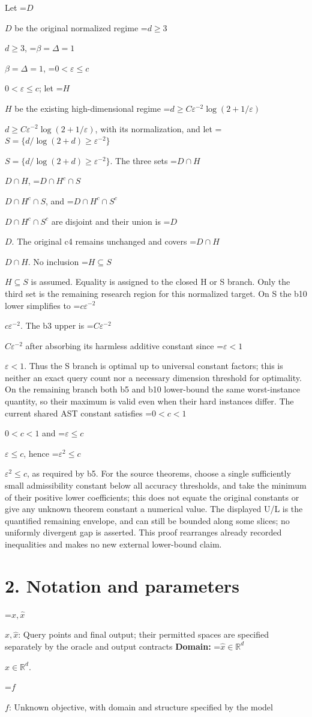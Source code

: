 \documentclass[10pt,a4paper]{article}
\newcommand{\AtlasMath}[1]{\par\begingroup\centering\setbox0=\hbox{$\displaystyle #1$}\ifdim\wd0>1.4\linewidth\typeout{ATLAS WIDE FORMULA: \the\wd0}\fi\ifdim\wd0>\linewidth\resizebox{\linewidth}{!}{\box0}\else\box0\fi\par\endgroup}
\newcommand{\AtlasInlineMath}[1]{\begingroup\setbox0=\hbox{$#1$}\ifdim\wd0>.4\linewidth\endgroup\AtlasMath{#1}\else\endgroup$#1$\fi}
\begin{document}
Let \AtlasInlineMath{D} be the original normalized regime \AtlasInlineMath{d\ge3}, \AtlasInlineMath{\beta=\Delta=1}, \AtlasInlineMath{0<\varepsilon\le c}; let \AtlasInlineMath{H} be the existing high-dimensional regime \AtlasInlineMath{d\ge C\varepsilon^{-2}\log(2+1/\varepsilon)}, with its normalization, and let \AtlasInlineMath{S=\{d/\log(2+d)\ge\varepsilon^{-2}\}}. The three sets \AtlasInlineMath{D\cap H}, \AtlasInlineMath{D\cap H^c\cap S}, and \AtlasInlineMath{D\cap H^c\cap S^c} are disjoint and their union is \AtlasInlineMath{D}. The original c4 remains unchanged and covers \AtlasInlineMath{D\cap H}. No inclusion \AtlasInlineMath{H\subseteq S} is assumed. Equality is assigned to the closed H or S branch. Only the third set is the remaining research region for this normalized target. On S the b10 lower simplifies to \AtlasInlineMath{c\varepsilon^{-2}}. The b3 upper is \AtlasInlineMath{C\varepsilon^{-2}} after absorbing its harmless additive constant since \AtlasInlineMath{\varepsilon<1}. Thus the S branch is optimal up to universal constant factors; this is neither an exact query count nor a necessary dimension threshold for optimality. On the remaining branch both b5 and b10 lower-bound the same worst-instance quantity, so their maximum is valid even when their hard instances differ. The current shared AST constant satisfies \AtlasInlineMath{0<c<1} and \AtlasInlineMath{\varepsilon\le c}, hence \AtlasInlineMath{\varepsilon^2\le c}, as required by b5. For the source theorems, choose a single sufficiently small admissibility constant below all accuracy thresholds, and take the minimum of their positive lower coefficients; this does not equate the original constants or give any unknown theorem constant a numerical value. The displayed U/L is the quantified remaining envelope, and can still be bounded along some slices; no uniformly divergent gap is asserted. This proof rearranges already recorded inequalities and makes no new external lower-bound claim.

\section{2. Notation and parameters}
\AtlasInlineMath{x,\widehat{x}}: Query points and final output; their permitted spaces are specified separately by the oracle and output contracts \textbf{Domain:} \AtlasInlineMath{\widehat{x}\in \mathbb{R}^d}.

\AtlasInlineMath{f}: Unknown objective, with domain and structure specified by the model
\end{document}
